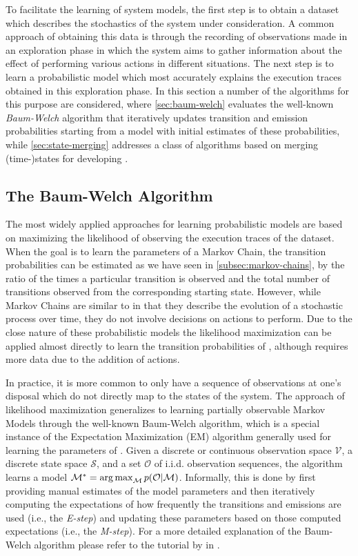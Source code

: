 To facilitate the learning of system models, the first step is to obtain a dataset which describes the stochastics of the system under consideration.
A common approach of obtaining this data is through the recording of observations made in an exploration phase in which the system aims to gather information about the effect of performing various actions in different situations.
The next step is to learn a probabilistic model which most accurately explains the execution traces obtained in this exploration phase.
In this section a number of the algorithms for this purpose are considered, where \autoref{sec:baum-welch} evaluates the well-known \textit{Baum-Welch} algorithm that iteratively updates transition and emission probabilities starting from a model with initial estimates of these probabilities, while \autoref{sec:state-merging} addresses a class of algorithms based on merging (time-)states for developing .

\subsection{The Baum-Welch Algorithm}
\label{sec:baum-welch}

The most widely applied approaches for learning probabilistic models are based on maximizing the likelihood of observing the execution traces of the dataset.
When the goal is to learn the parameters of a Markov Chain, the transition probabilities can be estimated as we have seen in \autoref{subsec:markov-chains}, by the ratio of the times a particular transition is observed and the total number of transitions observed from the corresponding starting state.
However, while Markov Chains are similar to  in that they describe the evolution of a stochastic process over time, they do not involve decisions on actions to perform.
Due to the close nature of these probabilistic models the likelihood maximization can be applied almost directly to learn the transition probabilities of , although requires more data due to the addition of actions.

In practice, it is more common to only have a sequence of observations at one's disposal which do not directly map to the states of the system.
The approach of likelihood maximization generalizes to learning partially observable Markov Models through the well-known Baum-Welch algorithm, which is a special instance of the Expectation Maximization (EM) algorithm generally used for learning the parameters of .
Given a discrete or continuous observation space $\mathcal{V}$, a discrete state space $\mathcal{S}$, and a set $\mathcal{O}$ of i.i.d. observation sequences, the algorithm learns a model $\mathcal{M}^\ast = \operatorname*{arg\,max}_\mathcal{M} p(\mathcal{O}\vert\mathcal{M})$.
Informally, this is done by first providing manual estimates of the model parameters and then iteratively computing the expectations of how frequently the transitions and emissions are used (i.e., the \textit{E-step}) and updating these parameters based on those computed expectations (i.e., the \textit{M-step}).
For a more detailed explanation of the Baum-Welch algorithm please refer to the tutorial by \citeauthor{bilmes1998gentle} in \cite{bilmes1998gentle}.


